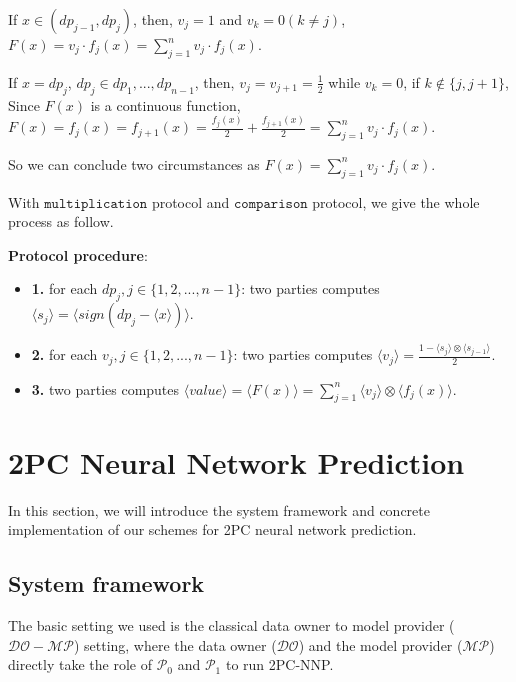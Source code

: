\documentclass[letterpaper]{article} %
\begin{document}
       If $x\in (dp_{j-1},dp_{j})$, then, $v_{j}=1$ and $v_{k}=0 (k\neq j)$, $F(x)=v_{j}\cdot f_{j}(x)=\sum_{j=1}^{n}v_{j}\cdot f_{j}(x)$.

       If $x=dp_{j} $, $ dp_{j}\in {dp_{1},...,dp_{n-1}}$,
       then, $v_{j}=v_{j+1}=\frac{1}{2}$ while $v_{k}=0$, if $ k\notin \{j,j+1\}$,
       Since $F(x)$ is a continuous function,
       $F(x)=f_{j}(x)=f_{j+1}(x)=\frac{f_{j}(x)}{2}+\frac{f_{j+1}(x)}{2}=\sum_{j=1}^{n}v_{j}\cdot f_{j}(x)$.

       So we can conclude two circumstances as $F(x)=\sum_{j=1}^{n}v_{j}\cdot f_{j}(x)$.

       With $\mathtt{multiplication}$ protocol and $\mathtt{comparison}$ protocol, we give the whole process as follow.%


       \textbf{Protocol procedure}:

       \begin{itemize}
           \item \textbf{1.}
           for each $dp_{j},j\in\{1,2,...,n-1\}$:
           two parties computes $\langle s_{j}\rangle=\langle sign(dp_{j}-\langle x\rangle)\rangle$.

           \item \textbf{2.}
           for each $v_{j},j\in\{1,2,...,n-1\}$:
           two parties computes $\langle v_{j} \rangle= \frac{1-\langle s_{j}\rangle\otimes \langle s_{j-1}\rangle}{2}$.

           \item \textbf{3.}
           two parties computes $\langle value\rangle=\langle F(x)\rangle=\sum_{j=1}^{n}\langle v_{j}\rangle\otimes \langle f_{j}(x)\rangle$.
       \end{itemize}


    \section{2PC Neural Network Prediction}
       In this section, we will introduce the system framework and concrete implementation of our
       schemes for 2PC neural network prediction.

    \subsection{System framework}
       The basic setting we used is the classical data owner to model provider ($\mathcal{DO}-\mathcal{MP}$) setting,
       where the data owner ($\mathcal{DO}$) and the model provider ($\mathcal{MP}$)
       directly take the role of $\mathcal{P}_{0}$ and $\mathcal{P}_{1}$ to run 2PC-NNP.
\end{document}

